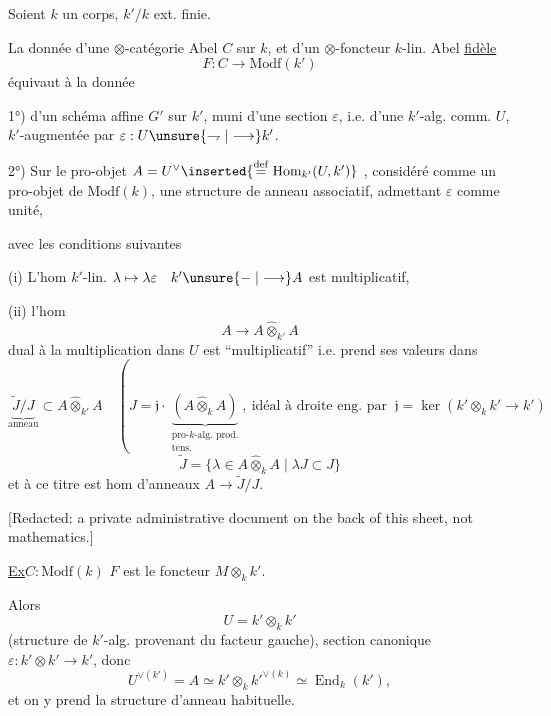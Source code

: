 Soient $k$ un corps, $k'/k$ ext. finie.

La donnée d'une $\otimes$-catégorie Abel $C$ sur $k$,
et d'un 
$\otimes$-foncteur $k$-lin. Abel  \uline{fidèle}
\[
F:C\longrightarrow\mathrm{Modf}(k')
\]
équivaut à la donnée

1°) d'un schéma affine $G'$ sur $k'$, muni d'une section $\varepsilon$,
i.e. d'une $k'$-alg. comm. $U$, 
$k'$-augmentée par $\varepsilon:U\unsure{\rightharpoondown|\longrightarrow} k'$.

2°) Sur le pro-objet $A=U^\vee
\inserted{\overset{\mathrm{def}}{=}\operatorname{Hom}_{k'}(U,k')}$
, considéré comme un pro-objet de
$\mathrm{Modf}(k)$, une structure de 
anneau associatif, admettant $\varepsilon$ comme unité,

avec les conditions suivantes

(i) L'hom $k'$-lin. $\lambda\mapsto\lambda\varepsilon\quad k'\unsure{\mathrel{-}|\longrightarrow} A$
est multiplicatif,


(ii) l'hom 
\[
A\longrightarrow A\widehat\otimes_{k'}A
\]
dual à la multiplication dans $U$ est ``multiplicatif'' i.e. prend ses valeurs
dans
\[
\underbrace{\widetilde J/J}_{\text{anneau}}\subset A\widehat\otimes_{k'}A
\quad
\left(
J=\mathfrak j\cdot
\underbrace{(A\widehat\otimes_k A)}_{\substack{\text{pro-}k\text{-alg. prod.}\\\text{tens.}}},
\ \text{idéal à droite eng. par }\
\mathfrak j=\ker(k'\otimes_k k'\longrightarrow k')
\right.
\]
\[
\widetilde J=\{\lambda\in A\widehat\otimes_k A\mid\lambda J\subset J\}
\]
et à ce titre est 
hom d'anneaux $A\longrightarrow\widetilde J/J$.

[Redacted: a private administrative document on the back of this sheet, not mathematics.]

\uline{Ex}\qquad $C:\mathrm{Modf}(k)$\qquad
$F$ est le foncteur $M\otimes_k k'$.

Alors
\[
U=k'\otimes_k k'
\]
(structure de $k'$-alg. provenant du facteur gauche),
section canonique $\varepsilon:k'\otimes k'\longrightarrow k'$,
donc
\[
U^{\vee(k')}=A\simeq k'\otimes_k {k'}^{\vee(k)}
\simeq\operatorname{End}_k(k'),
\]
et on y prend la structure d'anneau habituelle.

